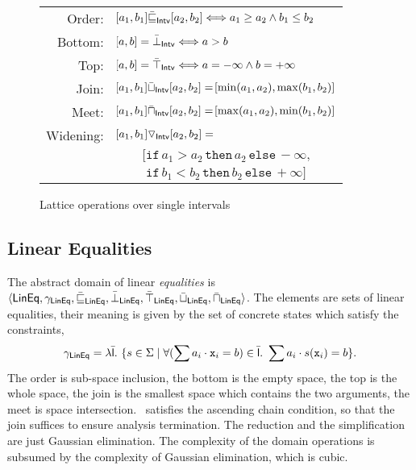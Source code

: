 \documentclass[sttt]{svjour}
\begin{document}
\begin{figure}%
\small
\begin{tabular}{rl}
Order:& $\![a_1, b_1] \bar{\sqsubseteq}_{\mathsf{Intv}} [a_2, b_2] \Longleftrightarrow a_1 \geq a_2 \wedge b_1 \leq b_2$ \\
Bottom:& $\![a, b] = \bar{\bot}_{\mathsf{Intv}} \Longleftrightarrow a > b$ \\
Top:& $\![a, b] = \bar{\top}_{\mathsf{Intv}} \Longleftrightarrow a = -\infty \wedge b = +\infty$\\
Join:& $\![a_1, b_1] \bar{\sqcup}_{\mathsf{Intv}} [a_2, b_2] = \![\mathrm{min}(a_1, a_2), \mathrm{max}(b_1, b_2)]$ \\
Meet:& $\![a_1, b_1] \bar{\sqcap}_{\mathsf{Intv}} [a_2, b_2] = \![\mathrm{max}(a_1, a_2), \mathrm{min}(b_1, b_2)]$ \\
Widening:& $\![a_1, b_1] \triangledown_{\mathsf{Intv}} [a_2, b_2] =$ \\
& $\quad \quad [\mathtt{if}\, a_1 > a_2 \,\mathtt{then}\, a_2 \,\mathtt{else}\, -\infty,$\\
& $\quad \quad \phantom{[}\mathtt{if}\, b_1 < b_2 \,\mathtt{then}\, b_2 \,\mathtt{else}\, +\infty]$\\
\end{tabular}
\caption{Lattice operations over single intervals}
\label{tab:intervals}
\end{figure}

\subsection{Linear Equalities}
The abstract domain of linear \emph{equalities}  is $\langle \mathsf{LinEq}, \gamma_{\mathsf{LinEq}},\allowbreak \bar{\sqsubseteq}_{\mathsf{LinEq}}, \bar{\bot}_{\mathsf{LinEq}}, \allowbreak \bar{\top}_{\mathsf{LinEq}}, \bar{\sqcup}_{\mathsf{LinEq}}, \bar{\sqcap}_{\mathsf{LinEq}} \rangle$.
The elements are sets of linear equalities, their meaning is given by the set of concrete states which satisfy the constraints, \ie\ 
\[
\gamma_{\mathsf{LinEq}} = \lambda \bar{\mathsf{\mathsf{l}}}.\ \{ s \in \Sigma \mid \forall (\sum a_i \cdot \mathtt{x}_i = b) \in \bar{\mathsf{\mathsf{l}}}.\ \sum a_i \cdot s(\mathtt{x}_i) = b  \} 
.
\]
The order is sub-space inclusion, the bottom is the empty space, the top is the whole space, the join is the smallest space which contains the two arguments,  the meet is space intersection.
\Karr\ satisfies the ascending chain condition, so that the join suffices to ensure analysis termination.
The reduction and the simplification are just Gaussian elimination.
The complexity of the domain operations is subsumed by the complexity of Gaussian elimination, which is cubic.
\end{document}
